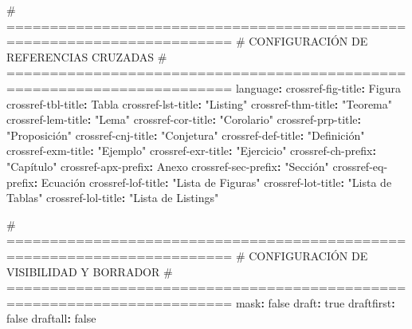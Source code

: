 \documentclass[
  doc,
  floatsintext,
  longtable,
  a4paper,
  nolmodern,
  notxfonts,
  notimes,
  12pt,
  colorlinks=true,linkcolor=blue,citecolor=blue,urlcolor=blue]{apa7}
\newenvironment{Shaded}{\begin{snugshade}}{\end{snugshade}}
\newcommand{\AttributeTok}[1]{\textcolor[rgb]{0.40,0.45,0.13}{#1}}
\newcommand{\CharTok}[1]{\textcolor[rgb]{0.13,0.47,0.30}{#1}}
\newcommand{\CommentTok}[1]{\textcolor[rgb]{0.37,0.37,0.37}{#1}}
\newcommand{\FunctionTok}[1]{\textcolor[rgb]{0.28,0.35,0.67}{#1}}
\newcommand{\KeywordTok}[1]{\textcolor[rgb]{0.00,0.23,0.31}{\textbf{#1}}}
\newcommand{\StringTok}[1]{\textcolor[rgb]{0.13,0.47,0.30}{#1}}
\begin{document}
\begin{Shaded}
\begin{Highlighting}[]
\CommentTok{\# ========================================================================}
\CommentTok{\# CONFIGURACIÓN DE REFERENCIAS CRUZADAS}
\CommentTok{\# ========================================================================}
\FunctionTok{language}\KeywordTok{:}
\AttributeTok{  }\FunctionTok{crossref{-}fig{-}title}\KeywordTok{:}\AttributeTok{ Figura}
\AttributeTok{  }\FunctionTok{crossref{-}tbl{-}title}\KeywordTok{:}\AttributeTok{ Tabla}
\AttributeTok{  }\FunctionTok{crossref{-}lst{-}title}\KeywordTok{:}\AttributeTok{ }\StringTok{"Listing"}
\AttributeTok{  }\FunctionTok{crossref{-}thm{-}title}\KeywordTok{:}\AttributeTok{ }\StringTok{"Teorema"}
\AttributeTok{  }\FunctionTok{crossref{-}lem{-}title}\KeywordTok{:}\AttributeTok{ }\StringTok{"Lema"}
\AttributeTok{  }\FunctionTok{crossref{-}cor{-}title}\KeywordTok{:}\AttributeTok{ }\StringTok{"Corolario"}
\AttributeTok{  }\FunctionTok{crossref{-}prp{-}title}\KeywordTok{:}\AttributeTok{ }\StringTok{"Proposición"}
\AttributeTok{  }\FunctionTok{crossref{-}cnj{-}title}\KeywordTok{:}\AttributeTok{ }\StringTok{"Conjetura"}
\AttributeTok{  }\FunctionTok{crossref{-}def{-}title}\KeywordTok{:}\AttributeTok{ }\StringTok{"Definición"}
\AttributeTok{  }\FunctionTok{crossref{-}exm{-}title}\KeywordTok{:}\AttributeTok{ }\StringTok{"Ejemplo"}
\AttributeTok{  }\FunctionTok{crossref{-}exr{-}title}\KeywordTok{:}\AttributeTok{ }\StringTok{"Ejercicio"}
\AttributeTok{  }\FunctionTok{crossref{-}ch{-}prefix}\KeywordTok{:}\AttributeTok{ }\StringTok{"Capítulo"}
\AttributeTok{  }\FunctionTok{crossref{-}apx{-}prefix}\KeywordTok{:}\AttributeTok{ Anexo}
\AttributeTok{  }\FunctionTok{crossref{-}sec{-}prefix}\KeywordTok{:}\AttributeTok{ }\StringTok{"Sección"}
\AttributeTok{  }\FunctionTok{crossref{-}eq{-}prefix}\KeywordTok{:}\AttributeTok{ Ecuación}
\AttributeTok{  }\FunctionTok{crossref{-}lof{-}title}\KeywordTok{:}\AttributeTok{ }\StringTok{"Lista de Figuras"}
\AttributeTok{  }\FunctionTok{crossref{-}lot{-}title}\KeywordTok{:}\AttributeTok{ }\StringTok{"Lista de Tablas"}
\AttributeTok{  }\FunctionTok{crossref{-}lol{-}title}\KeywordTok{:}\AttributeTok{ }\StringTok{"Lista de Listings"}

\CommentTok{\# ========================================================================}
\CommentTok{\# CONFIGURACIÓN DE VISIBILIDAD Y BORRADOR}
\CommentTok{\# ========================================================================}
\FunctionTok{mask}\KeywordTok{:}\AttributeTok{ }\CharTok{false}
\FunctionTok{draft}\KeywordTok{:}\AttributeTok{ }\CharTok{true}
\FunctionTok{draftfirst}\KeywordTok{:}\AttributeTok{ }\CharTok{false}
\FunctionTok{draftall}\KeywordTok{:}\AttributeTok{ }\CharTok{false}


\end{Highlighting}
\end{Shaded}
\end{document}
